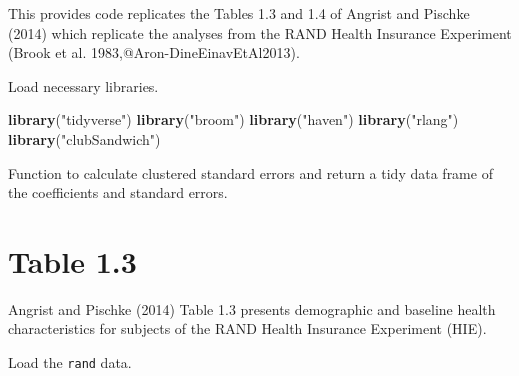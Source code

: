 \documentclass[]{book}
\newenvironment{Shaded}{\begin{snugshade}}{\end{snugshade}}
\newcommand{\ControlFlowTok}[1]{\textcolor[rgb]{0.13,0.29,0.53}{\textbf{#1}}}
\newcommand{\DataTypeTok}[1]{\textcolor[rgb]{0.13,0.29,0.53}{#1}}
\newcommand{\KeywordTok}[1]{\textcolor[rgb]{0.13,0.29,0.53}{\textbf{#1}}}
\newcommand{\NormalTok}[1]{#1}
\newcommand{\OperatorTok}[1]{\textcolor[rgb]{0.81,0.36,0.00}{\textbf{#1}}}
\newcommand{\StringTok}[1]{\textcolor[rgb]{0.31,0.60,0.02}{#1}}
\theoremstyle{definition}
\theoremstyle{definition}
\theoremstyle{definition}
\theoremstyle{remark}
\begin{document}
This provides code replicates the Tables 1.3 and 1.4 of Angrist and
Pischke (2014) which replicate the analyses from the RAND Health
Insurance Experiment (Brook et al. 1983,@Aron-DineEinavEtAl2013).

Load necessary libraries.

\begin{Shaded}
\begin{Highlighting}[]
\KeywordTok{library}\NormalTok{(}\StringTok{"tidyverse"}\NormalTok{)}
\KeywordTok{library}\NormalTok{(}\StringTok{"broom"}\NormalTok{)}
\KeywordTok{library}\NormalTok{(}\StringTok{"haven"}\NormalTok{)}
\KeywordTok{library}\NormalTok{(}\StringTok{"rlang"}\NormalTok{)}
\KeywordTok{library}\NormalTok{(}\StringTok{"clubSandwich"}\NormalTok{)}
\end{Highlighting}
\end{Shaded}

Function to calculate clustered standard errors and return a tidy data
frame of the coefficients and standard errors.

\begin{Shaded}
\end{Shaded}

\hypertarget{table-1.3}{%
\section{Table 1.3}\label{table-1.3}}

Angrist and Pischke (2014) Table 1.3 presents demographic and baseline
health characteristics for subjects of the RAND Health Insurance
Experiment (HIE).

Load the \texttt{rand} data.
\end{document}
